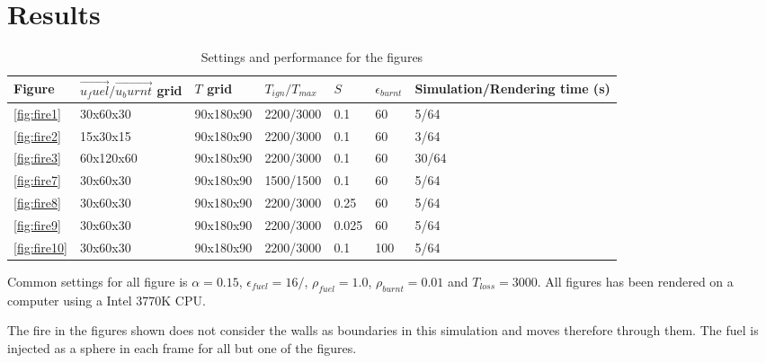 \section{Results}

\begin{table}[h!]\footnotesize
\caption{Settings and performance for the figures}
\begin{tabular}{lllllll}
\hline
Figure & $\vec{u_fuel}/\vec{u_burnt}$ grid & $T$ grid & $T_{ign}/T_{max}$ & $S$ & $\epsilon_{burnt}$ & Simulation/Rendering time (s) \\
\hline
\ref{fig:fire1}      &	30x60x30	&	90x180x90	&	2200/3000	&	0.1	&		60	&	5/64	\\
\ref{fig:fire2}      &	15x30x15	&	90x180x90	&	2200/3000	&	0.1	&		60	&	3/64	\\
\ref{fig:fire3}      &	60x120x60	&	90x180x90	&	2200/3000	&	0.1	&		60	&	30/64	\\
\ref{fig:fire7}      &	30x60x30	&	90x180x90	&	1500/1500	&	0.1	&		60	&	5/64	\\
\ref{fig:fire8}      &	30x60x30	&	90x180x90	&	2200/3000	&	0.25	&	60	&	5/64	\\
\ref{fig:fire9}      &	30x60x30	&	90x180x90	&	2200/3000	&	0.025	&	60	&	5/64	\\
\ref{fig:fire10}     &	30x60x30	&	90x180x90	&	2200/3000	&	0.1		&	100	&	5/64	\\
\hline
\end{tabular}
\end{table}

Common settings for all figure is $\alpha = 0.15$, $\epsilon_{fuel} = 16/$,  $\rho_{fuel} = 1.0$, $\rho_{burnt} = 0.01$ and $T_{loss} = 3000$. All figures has been rendered on a computer using a Intel 3770K CPU. 

The fire in the figures shown does not consider the walls as boundaries in this simulation and moves therefore through them. The fuel is injected as a sphere in each frame for all but one of the figures.

